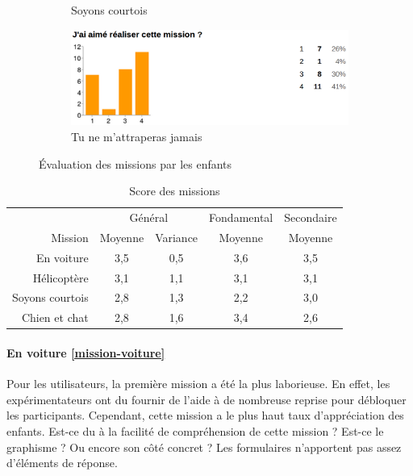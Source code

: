 \begin{figure}
\begin{center}
\begin{subfigure}{.49\textwidth}
      \caption{Soyons courtois}
    \end{subfigure}
    \begin{subfigure}{.49\textwidth}
      \includegraphics[width=\textwidth]{content/8-validation/images/chien}
      \caption{Tu ne m'attraperas jamais}
    \end{subfigure}
    \caption{Évaluation des missions par les enfants}
    \label{fig:evaluation-mission}
  \end{center}
\end{figure}

\begin{table}
  \begin{center}
    \begin{tabular}{r|cc|c|c}
                       & \multicolumn{2}{c|}{Général} & Fondamental & Secondaire \\
      Mission          & Moyenne & Variance           & Moyenne     & Moyenne \\ \hline
      En voiture       & 3,5 & 0,5 & 3,6 & 3,5 \\
      Hélicoptère      & 3,1 & 1,1 & 3,1 & 3,1 \\
      Soyons courtois  & 2,8 & 1,3 & 2,2 & 3,0 \\
      Chien et chat    & 2,8 & 1,6 & 3,4 & 2,6 \\
    \end{tabular}
  \end{center}
  \caption{Score des missions}
  \label{tab:form-missions}
\end{table}

\paragraph{En voiture \ref{mission-voiture}}
Pour les utilisateurs, la première mission a été la plus laborieuse. En effet, les expérimentateurs ont du fournir de l'aide à de nombreuse reprise pour débloquer les participants. Cependant, cette mission a le plus haut taux d'appréciation des enfants. Est-ce du à la facilité de compréhension de cette mission ? Est-ce le graphisme ? Ou encore son côté concret ? Les formulaires n'apportent pas assez d'éléments de réponse.

